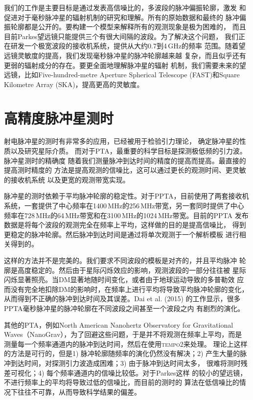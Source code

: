 我们的工作是主要目标是通过发表高信噪比的，多波段的脉冲偏振轮廓，激发
和促进对于毫秒脉冲星的辐射机制的研究和理解。所有的原始数据和最终的
脉冲偏振轮廓都是公开的。要构建一个模型来解释所有的观测现象是极为困难的，
而且目前Parkes望远镜只能提供三个有很大间隔的波段。为了解决这个问题，
我们正在研发一个极宽波段的接收机系统，提供从大约0.7到4\,GHz的频率
范围。随着望远镜灵敏度的提高，我们发现毫秒脉冲星的脉冲轮廓越来越
复杂，而且似乎还有更弱的辐射成分的存在。要更全面地理解脉冲星的辐射
机制，我们需要未来的望远镜，比如Five-hundred-metre Aperture Spherical 
Telescope (FAST)和Square Kilometre Array (SKA)，提高更高的灵敏度。

\section{高精度脉冲星测时}

射电脉冲星的测时有非常多的应用，已经被用于检验引力理论\supercite{Kramer06}，
确定脉冲星的性质\supercite{Antoniadis}以及研究星际介质\supercite{Keith13}。
而对于PTA，最重要的科学目标是探测极低频的引力波。脉冲星测时的精确度
随着我们测量脉冲到达时间的精度的提高而提高。最直接的提高测时精度的
方法是提高观测的信噪比，这可以通过更长的观测时间、更灵敏的接收机系统
以及更宽的观测带宽实现。

脉冲星的测时依赖于平均脉冲轮廓的稳定性。对于PPTA，目前使用了两套接收机
系统，一套提供了中心频率在1400\,MHz的256\,MHz带宽，另一套同时提供了中心
频率在728\,MHz的64\,MHz带宽和在3100\,MHz的1024\,MHz带宽。目前的PPTA
发布数据是将每个波段的观测完全在频率上平均，这样做的目的是提高信噪比，
得到更稳定的脉冲轮廓。然后脉冲到达时间是通过将单次观测于一个解析模板
进行相关得到的。

这样的方法并不是完美的。我们要求不同波段的模板是对齐的，并且平均脉冲
轮廓是高度稳定的。然后由于星际闪烁效应的影响，观测波段的一部分往往被
星际闪烁显著照亮。当DM显著地随时间变化，或者由于地球运动导致的多普勒效
应而没有完全地扣除DM的影响时，在频率上进行平均将导致平均脉冲轮廓的变化，
从而得到不正确的脉冲到达时间及其误差。Dai et al. (2015)\supercite{dhm+15}
的工作显示，很多PPTA毫秒脉冲星的脉冲轮廓在不同波段之间甚至一个波段之内
有剧烈的演化。

其他的PTA，例如North American Nanohertz Observatory for Gravitational 
Waves（NanoGrav），为了回避这些问题，于是并不将观测在频率上平均，而是
测量每一个频率通道内的脉冲到达时间，然后在使用\textsc{tempo2}来处理。
理论上这样的方法是可行的，但是1) 脉冲轮廓随频率的演化仍然没有解决；2) 
产生大量的脉冲到达时间，对探测引力波造成困难；3) 由于脉冲到达时间太多，
很难将测时残差可视化；4) 每个频率通道内的信噪比较低。对于Parkes这样
的较小的望远镜，不进行频率上的平均将导致过低的信噪比，而目前的测时的
算法在低信噪比的情况下往往不可靠，从而导致科学结果的偏差。

